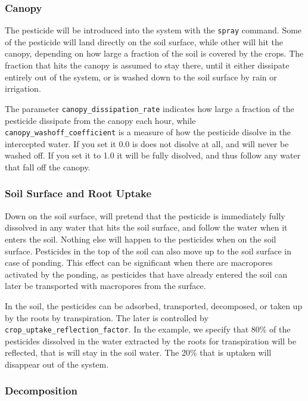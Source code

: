 \documentclass[a4paper,11pt]{article}
\begin{document}
\subsubsection{Canopy}

The pesticide will be introduced into the system with the
\texttt{spray} command.  Some of the pesticide will land directly on
the soil surface, while other will hit the canopy, depending on how
large a fraction of the soil is covered by the crops.  The fraction
that hits the canopy is assumed to stay there, until it either
dissipate entirely out of the system, or is washed down to the soil
surface by rain or irrigation.  

The parameter \texttt{canopy\_dissipation\_rate} indicates how large a
fraction of the pesticide dissipate from the canopy each hour, while
\linebreak{}\texttt{canopy\_washoff\_coefficient} is a measure of how
the pesticide disolve in the intercepted water.  If you set it 0.0 is
does not disolve at all, and will never be washed off.  If you set it
to 1.0 it will be fully disolved, and thus follow any water that fall
off the canopy.

\subsubsection{Soil Surface and Root Uptake}

Down on the soil surface, \daisy{} will pretend that the pesticide is
immediately fully dissolved in any water that hits the soil surface,
and follow the water when it enters the soil.  Nothing else will
happen to the pesticides when on the soil surface.  Pesticides in the
top of the soil can also move up to the soil surface in case of
ponding.  This effect can be significant when there are macropores
activated by the ponding, as pesticides that have already entered the
soil can later be transported with macropores from the surface.

In the soil, the pesticides can be adsorbed, transported, decomposed,
or taken up by the roots by transpiration.  The later is controlled by
\linebreak{}\texttt{crop\_uptake\_reflection\_factor}.  In the
example, we specify that 80\% of the pesticides dissolved in the water
extracted by the roots for transpiration will be reflected, that is
will stay in the soil water.  The 20\% that is uptaken will disappear
out of the system.

\subsubsection{Decomposition}
\end{document}
